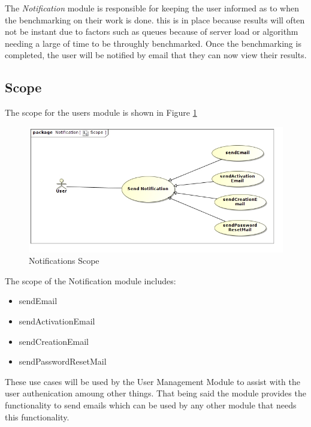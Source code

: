 The \textit{Notification} module is responsible for keeping the user informed 
as to when the benchmarking on their work is done. this is in place because
results will often not be instant due to factors such as queues because of server
load or algorithm needing a large of time to be throughly benchmarked. Once the
benchmarking is completed, the user will be notified by email that they can now
view their results.

\subsection{Scope}
The scope for the users module is shown in Figure \ref{Notifications Scope}
\begin{figure}[H]
	\begin{center}
		\includegraphics[scale=0.5]{../Diagrams and Charts/Notifications/Scope.jpg}
		\caption{Notifications Scope}
	\end{center}
	\label{Notifications Scope}
\end{figure}
The scope of the Notification module includes:
\begin{itemize}
	\item sendEmail
	\item sendActivationEmail
	\item sendCreationEmail
	\item sendPasswordResetMail
\end{itemize}

These use cases will be used by the User Management Module to assist with the user
authenication amoung other things. That being said the module provides the
functionality to send emails which can be used by any other module that needs this
functionality.

